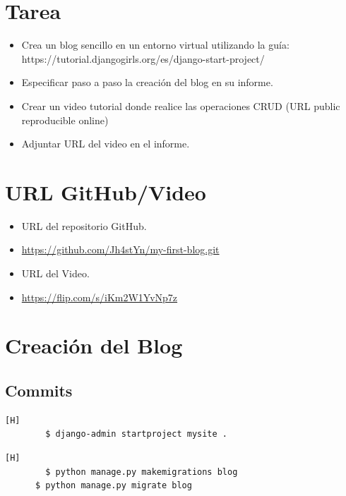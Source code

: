 \documentclass{article}
\begin{document}
	\section{Tarea}
	\begin{itemize}		
	\item Crea un blog sencillo en un entorno virtual utilizando la guía: https://tutorial.djangogirls.org/es/django-start-project/
		\item Especificar paso a paso la creación del blog en su informe.
		\item Crear un video tutorial donde realice las operaciones CRUD (URL public  reproducible online)
            \item  Adjuntar URL del video en el informe.
	\end{itemize}
	
	\section{URL GitHub/Video}
	\begin{itemize}
            \item URL del repositorio GitHub.
		\item \url{https://github.com/Jh4stYn/my-first-blog.git}
		\item URL del Video.
		\item \url{https://flip.com/s/iKm2W1YvNp7z}
	\end{itemize}
	
	\section{Creación del Blog}
	
	\subsection{Commits}
 
	\begin{lstlisting}[language=bash,caption={Crear una aplicación}][H]            
		$ django-admin startproject mysite .
	\end{lstlisting}	

        
 
        \begin{lstlisting}[language=bash,caption={Agregar nuestro nuevo modelo a la base de datos}][H]
		$ python manage.py makemigrations blog
      $ python manage.py migrate blog  
	\end{lstlisting}
\end{document}
